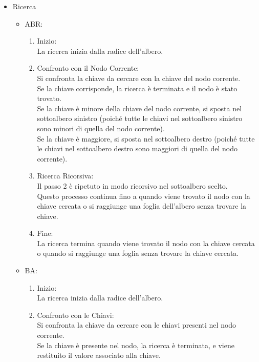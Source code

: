 \begin{itemize}
    \item Ricerca
    \begin{itemize}
        \item ABR: 
        \begin{enumerate}
            \item Inizio:\\
                La ricerca inizia dalla radice dell'albero.
            \item Confronto con il Nodo Corrente:\\
                Si confronta la chiave da cercare con la chiave del nodo corrente.\\
                Se la chiave corrisponde, la ricerca è terminata e il nodo è stato trovato.\\
                Se la chiave è minore della chiave del nodo corrente, si sposta nel sottoalbero sinistro (poiché tutte le chiavi nel sottoalbero sinistro sono minori di quella del nodo corrente).\\
                Se la chiave è maggiore, si sposta nel sottoalbero destro (poiché tutte le chiavi nel sottoalbero destro sono maggiori di quella del nodo corrente).
            \item Ricerca Ricorsiva:\\
                Il passo 2 è ripetuto in modo ricorsivo nel sottoalbero scelto.\\
                Questo processo continua fino a quando viene trovato il nodo con la chiave cercata o si raggiunge una foglia dell'albero senza trovare la chiave.
            \item Fine:\\
                La ricerca termina quando viene trovato il nodo con la chiave cercata o quando si raggiunge una foglia senza trovare la chiave cercata.
        \end{enumerate}        
        \item BA: 
        \begin{enumerate}
            \item Inizio:\\
                La ricerca inizia dalla radice dell'albero.
            \item Confronto con le Chiavi:\\
                Si confronta la chiave da cercare con le chiavi presenti nel nodo corrente.\\
                Se la chiave è presente nel nodo, la ricerca è terminata, e viene restituito il valore associato alla chiave.\\

\end{enumerate}
\end{itemize}
\end{itemize}

